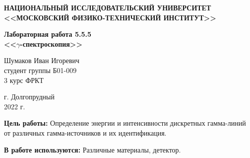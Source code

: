 \documentclass[a4paper,12pt]{article} %
\begin{document}
	
	
	\begin{center}
		
		\textbf{НАЦИОНАЛЬНЫЙ ИССЛЕДОВАТЕЛЬСКИЙ УНИВЕРСИТЕТ \\ <<МОСКОВСКИЙ ФИЗИКО-ТЕХНИЧЕСКИЙ ИНСТИТУТ>>}
		\vspace{13ex}
		
		\textbf{Лабораторная работа 5.5.5\\ <<$\gamma$-спектроскопия>>}
		\vspace{40ex}
		
		\normalsize{Шумаков Иван Игоревич \\ студент группы Б01-009\\ 3 курс ФРКТ\\}
	\end{center}
	
	\vfill 
	
	\begin{center}
		г. Долгопрудный\\ 
		2022 г.
	\end{center}
	
	
	\thispagestyle{empty} %
	\newpage

	\textbf{Цель работы:} Определение энергии и интенсивности дискретных гамма-линий от различных гамма-источников и их идентификация.\par
  \textbf{В работе используются:} Различные материалы, детектор.\par
\end{document}
